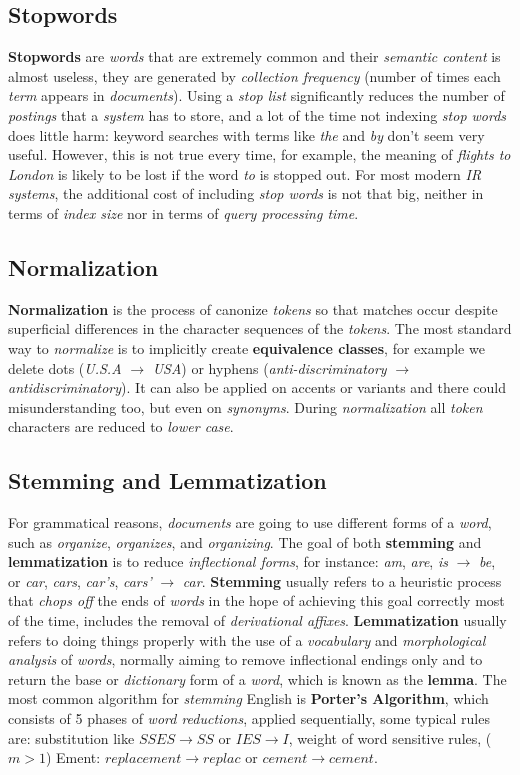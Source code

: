 \documentclass{article}
\begin{document}
\subsection{Stopwords}
\textbf{Stopwords} are \emph{words} that are extremely common and their \emph{semantic content} is almost useless, they are generated by \emph{collection frequency} (number of times each \emph{term} appears in \emph{documents}). Using a \emph{stop list }significantly reduces the number of \emph{postings} that a \emph{system} has to store, and a lot of the time not indexing \emph{stop words} does little harm: keyword searches with terms like \emph{the} and \emph{by} don’t seem very useful. However, this is not true every time, for example, the meaning of \emph{flights to London} is likely to be lost if the word \emph{to} is stopped out. For most modern \emph{IR systems}, the additional cost of including \emph{stop words} is not that big, neither in terms of \emph{index size} nor in terms of \emph{query processing time}.
\subsection{Normalization}
\textbf{Normalization} is the process of canonize \emph{tokens} so that matches occur despite superficial differences in the character sequences of the \emph{tokens}. The most standard way to \emph{normalize} is to implicitly create \textbf{equivalence classes}, for example we delete dots (\emph{U.S.A} $\rightarrow$ \emph{USA}) or hyphens (\emph{anti-discriminatory} $\rightarrow$ \emph{antidiscriminatory}). It can also be applied on accents or variants and there could misunderstanding too, but even on \emph{synonyms}. During \emph{normalization} all \emph{token} characters are reduced to \emph{lower case}.
\subsection{Stemming and Lemmatization}
For grammatical reasons, \emph{documents} are going to use different forms of a \emph{word}, such as \emph{organize}, \emph{organizes}, and \emph{organizing}. The goal of both \textbf{stemming} and \textbf{lemmatization} is to reduce \emph{inflectional forms}, for instance: \emph{am}, \emph{are}, \emph{is} $\rightarrow$ \emph{be}, or \emph{car}, \emph{cars}, \emph{car's}, \emph{cars' }$\rightarrow$ \emph{car}. \textbf{Stemming} usually refers to a heuristic process that \emph{chops off} the ends of \emph{words} in the hope of achieving this goal correctly most of the time, includes the removal of \emph{derivational affixes}. \textbf{Lemmatization} usually refers to doing things properly with the use of a \emph{vocabulary} and \emph{morphological analysis} of \emph{words}, normally aiming to remove inflectional endings only and to return the base or \emph{dictionary} form of a \emph{word}, which is known as the \textbf{lemma}. The most common algorithm for \emph{stemming} English is \textbf{Porter's Algorithm}, which consists of 5 phases of \emph{word reductions}, applied sequentially, some typical rules are: substitution like $SSES \rightarrow SS$ or $IES \rightarrow I$, weight of word sensitive rules, ($m > 1$) Ement: $replacement \rightarrow replac$ or $cement \rightarrow cement$. 
\end{document}

